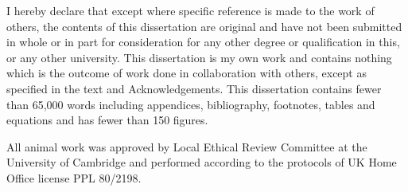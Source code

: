 
\begin{declaration}

I hereby declare that except where specific reference is made to the work of
others, the contents of this dissertation are original and have not been
submitted in whole or in part for consideration for any other degree or
qualification in this, or any other university. This dissertation is my own
work and contains nothing which is the outcome of work done in collaboration
with others, except as specified in the text and Acknowledgements. This
dissertation contains fewer than 65,000 words including appendices,
bibliography, footnotes, tables and equations and has fewer than 150 figures.


All animal work was approved by Local Ethical Review Committee at the University of Cambridge and performed according to the protocols of UK Home Office license PPL 80/2198.

\end{declaration}

